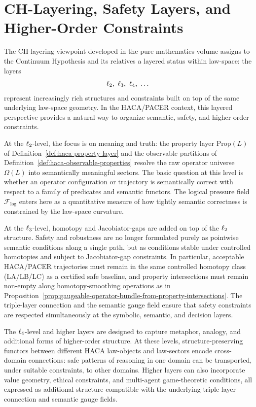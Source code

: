 \documentclass[11pt]{book}
\theoremstyle{plain}
\theoremstyle{definition}
\theoremstyle{remark}
\begin{document}
\section[CH-Layering, Safety Layers, and Higher-Order Constraints]{CH-Layering, Safety Layers, and Higher-Order Constraints}


The CH-layering viewpoint developed in the pure mathematics volume
assigns to the Continuum Hypothesis and its relatives a layered status
within law-space: the layers
\[
  \Layer_2,\ \Layer_3,\ \Layer_4,\ \dots
\]
represent increasingly rich structures and constraints built on top of
the same underlying law-space geometry. In the HACA/PACER context, this
layered perspective provides a natural way to organize semantic,
safety, and higher-order constraints.

At the $\ell_2$-level, the focus is on meaning and truth: the
property layer $\mathrm{Prop}(L)$ of
Definition~\ref{def:haca-property-layer} and the observable partitions
of Definition~\ref{def:haca-observable-properties} resolve the raw
operator universe $\Omega(L)$ into semantically meaningful sectors. The
basic question at this level is whether an operator configuration or
trajectory is semantically correct with respect to a family of
predicates and semantic functors. The logical pressure field
$\mathcal{F}_{\mathrm{log}}$ enters here as a quantitative measure of
how tightly semantic correctness is constrained by the law-space
curvature.

At the $\ell_3$-level, homotopy and Jacobiator-gaps are added on
top of the $\ell_2$ structure. Safety and robustness are no longer
formulated purely as pointwise semantic conditions along a single path,
but as conditions stable under controlled homotopies and subject to
Jacobiator-gap constraints. In particular, acceptable HACA/PACER
trajectories must remain in the same controlled homotopy class (LA/LB/LC)
as a certified safe baseline, and property intersections must remain
non-empty along homotopy-smoothing operations as in
Proposition~\ref{prop:gaugeable-operator-bundle-from-property-intersections}.
The triple-layer connection and the semantic gauge field ensure that
safety constraints are respected simultaneously at the symbolic,
semantic, and decision layers.

The $\ell_4$-level and higher layers are designed to capture
metaphor, analogy, and additional forms of higher-order structure. At
these levels, structure-preserving functors between different HACA
law-objects and law-sectors encode cross-domain connections: safe
patterns of reasoning in one domain can be transported, under suitable
constraints, to other domains. Higher layers can also incorporate
value geometry, ethical constraints, and multi-agent game-theoretic
conditions, all expressed as additional structure compatible with the
underlying triple-layer connection and semantic gauge fields.
\end{document}
